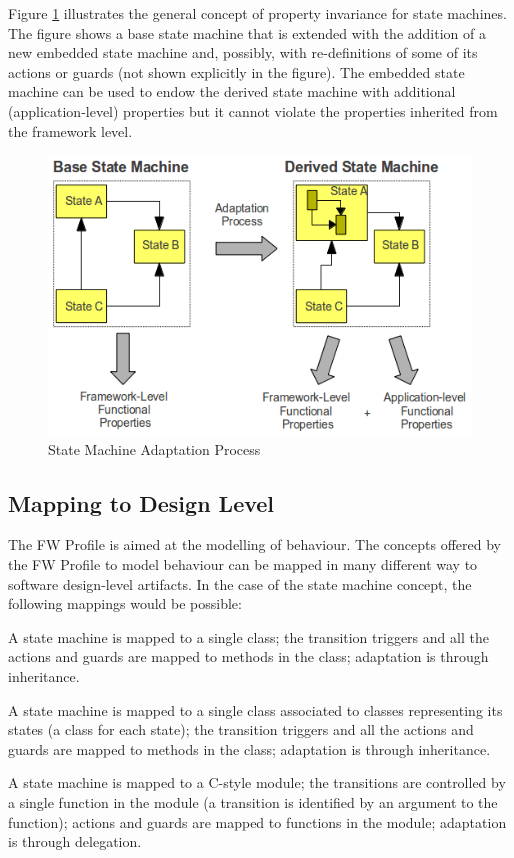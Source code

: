 \documentclass[a4paper,10pt]{article}
\newenvironment{fw_itemize}						%
{\begin{itemize}
  \setlength{\itemsep}{1mm}
  \setlength{\parskip}{0pt}
  \setlength{\parsep}{0pt}}
{\end{itemize}}
\begin{document}
Figure \ref{fig:SmAdaptation} illustrates the general concept of property invariance for state machines. The
figure shows a base state machine that is extended with the addition of a new embedded state
machine and, possibly, with re-definitions of some of its actions or guards (not shown
explicitly in the figure). The embedded state machine can be used to endow the derived state
machine with additional (application-level) properties but it cannot violate the properties
inherited from the framework level.

\begin{figure}[ht]
 \centering
 \includegraphics[scale=0.45,keepaspectratio=true]{../images/SM_Adaptation.png}
 \caption{State Machine Adaptation Process}
 \label{fig:SmAdaptation}
\end{figure}

\subsection{Mapping to Design Level}
The FW Profile is aimed at the modelling of behaviour. The concepts offered by the FW
Profile to model behaviour can be mapped in many different way to software design-level
artifacts. In the case of the state machine concept, the following mappings would be possible:

\begin{fw_itemize} 
\item A state machine is mapped to a single class; the transition triggers and all the actions
and guards are mapped to methods in the class; adaptation is through inheritance.
\item A state machine is mapped to a single class associated to classes representing its states 
(a class for each state); the transition triggers and all the actions and guards are 
mapped to methods in the class; adaptation is through inheritance.
\item A state machine is mapped to a C-style module; the transitions are controlled by a 
single function in the module (a transition is identified by an argument to the 
function); actions and guards are mapped to functions in the module; adaptation is 
through delegation. 
\end{fw_itemize}
\end{document}
